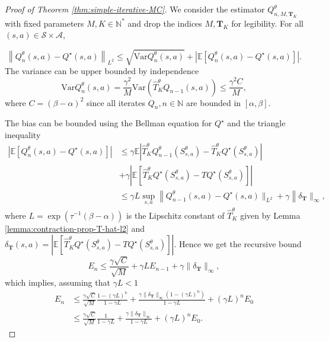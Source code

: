 \documentclass[11pt]{article}
\numberwithin{equation}{section}
\theoremstyle{definition}
\theoremstyle{remark}
\def\cA{\mathcal{A}}
\def\cS{\mathcal{S}}
\def\N{{\mathbb{N}}}
\begin{document}
\begin{proof}[Proof of Theorem \ref{thm:simple-iterative-MC}]
We consider the   estimator $Q^\theta_{n,M,\mathbf T_K }$ with fixed parameters $M, K \in \N^*$ and drop the indices $M,\mathbf T_K $ for legibility. For all  $(s,a) \in \cS \times \cA$,

\[
	\left\|Q_{n}^\theta(s,a) - Q^\star(s,a) \right\|_{L^2} \leq \sqrt{\mathrm{Var} Q_n^\theta(s,a)} + \left| \mathbb E \left[ Q^\theta_n(s,a) - Q^\star(s,a) \right] \right|.
\]
The variance can be upper bounded by independence
\[
	\mathrm{Var} Q_n^\theta(s,a) = \frac{\gamma^2}{M} \mathrm{Var} \left( \hat{T}^\theta_K Q_{n-1}(s,a) \right) \leq \frac{\gamma^2C}{M},
\]
where $C = \left( \beta - \alpha \right)^2$ since all iterates $Q_{n}, n \in \N$ are bounded in $[\alpha, \beta]$.

The bias can be bounded   using the Bellman equation for $Q^\star $   and the triangle inequality 
\[
	\begin{aligned}
		\left| \mathbb E \left[ Q^\theta_n(s,a) - Q^\star(s,a)\right] \right| &\leq \gamma \mathbb E \left| \hat{T}_K^\theta Q^\theta_{n-1}(S_{s,a}^\theta) - \hat{T}_K^\theta Q^\star(S_{s,a}^\theta)\right| \\
        &+\gamma \left|\mathbb E \left[\hat{T}_K^\theta Q^\star(S_{s,a}^\theta)  - TQ^\star(S^\theta_{s,a})\right]\right| \\
										      &\leq \gamma L \sup_{s,a} \left\|Q^\theta_{n-1}(s,a) - Q^\star(s,a) \|_{L^2} + \gamma \right\| \delta_{\mathbf T}\|_{\infty},
\end{aligned}
\]	
where $L = \exp \left( \tau^{-1}(\beta - \alpha) \right)$ is the Lipschitz constant of $\hat{T}_K^\theta$ given by Lemma \ref{lemma:contraction-prop-T-hat-l2} and $\delta_{\mathbf T}(s,a) = \left|\mathbb E \left[\hat{T}_K^\theta Q^\star(S_{s,a}^\theta)  - TQ^\star(S^\theta_{s,a})\right]\right|$. Hence we get the recursive bound
\[
	E_n \leq \frac{\gamma \sqrt{C}}{\sqrt{M}} + \gamma L E_{n-1} + \gamma \| \delta_{\mathbf T}\|_{\infty},
\]
which implies, assuming that $\gamma L < 1$
\[
	\begin{aligned}
		E_n &\leq \frac{\gamma \sqrt{C}}{\sqrt{M}} \frac{ 1 - (\gamma L)^n}{1 - \gamma L} + \frac{\gamma \| \delta_{\mathbf T}\|_{\infty}(1 - (\gamma L)^n)}{1 - \gamma L} + (\gamma L)^n E_0 \\
		    & \leq \frac{\gamma \sqrt{C}}{\sqrt{M}} \frac{1}{1 - \gamma L} + \frac{\gamma \| \delta_{\mathbf T}\|_{\infty}}{1 - \gamma L} + (\gamma L)^n E_0.
\end{aligned}
	\]

\end{proof}
\end{document}

